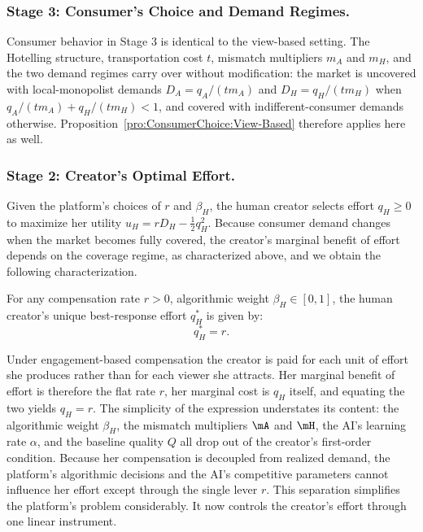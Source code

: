 \subsubsection*{Stage 3: Consumer's Choice and Demand Regimes.} Consumer behavior in Stage 3 is identical to the view-based setting. The Hotelling structure, transportation cost $t$, mismatch multipliers $m_A$ and $m_H$, and the two demand regimes carry over without modification: the market is uncovered with local-monopolist demands $D_A = q_A/(t m_A)$ and $D_H = q_H/(t m_H)$ when $q_A/(t m_A) + q_H/(t m_H) < 1$, and covered with indifferent-consumer demands otherwise. Proposition~\ref{pro:ConsumerChoice:View-Based} therefore applies here as well. 


\subsubsection*{Stage 2: Creator's Optimal Effort.}
Given the platform's choices of $r$ and $\beta_H$, the human creator selects effort $q_H \ge 0$ to maximize her utility $u_H = r D_H - \frac{1}{2} q_H^2$. Because consumer demand changes when the market becomes fully covered, the creator's marginal benefit of effort depends on the coverage regime, as characterized above, and we obtain the following characterization. 

\begin{proposition}
\label{prop:Optimal:qH:Eng-Based}
For any compensation rate $r>0$, algorithmic weight $\beta_H \in [0,1]$, the human creator's unique best-response effort $q_H^*$ is given by:
\[
    q_H^*=r.
\]
\end{proposition}

Under engagement-based compensation the creator is paid for each unit 
of effort she produces rather than for each viewer she attracts. Her 
marginal benefit of effort is therefore the flat rate $r$, her 
marginal cost is $q_H$ itself, and equating the two yields $q_H = r$. 
The simplicity of the expression understates its content: the 
algorithmic weight $\beta_H$, the mismatch multipliers $\mA$ and 
$\mH$, the AI's learning rate $\alpha$, and the baseline quality $Q$ 
all drop out of the creator's first-order condition. Because her 
compensation is decoupled from realized demand, the platform's 
algorithmic decisions and the AI's competitive parameters cannot 
influence her effort except through the single lever $r$. This 
separation simplifies the platform's problem considerably. It now 
controls the creator's effort through one linear instrument.


